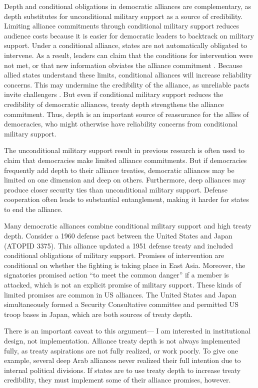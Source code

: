 \documentclass[12pt]{article}
\begin{document}
Depth and conditional obligations in democratic alliances are complementary, as depth substitutes for unconditional military support as a source of credibility. 
Limiting alliance commitments through conditional military support reduces audience costs because it is easier for democratic leaders to backtrack on military support. 
Under a conditional alliance, states are not automatically obligated to intervene. 
As a result, leaders can claim that the conditions for intervention were not met, or that new information obviates the alliance commitment \citep{LevenduskyHorowitz2012}. 
Because allied states understand these limits, conditional alliances will increase reliability concerns. 
This may undermine the credibility of the alliance, as unreliable pacts invite challengers \citep{Smith1995}. 
But even if conditional military support reduces the credibility of democratic alliances, treaty depth strengthens the alliance commitment. 
Thus, depth is an important source of reassurance for the allies of democracies, who might otherwise have reliability concerns from conditional military support. 


The unconditional military support result in previous research is often used to claim that democracies make limited alliance commitments. 
But if democracies frequently add depth to their alliance treaties, democratic alliances may be limited on one dimension and deep on others. 
Furthermore, deep alliances may produce closer security ties than unconditional military support. 
Defense cooperation often leads to substantial entanglement, making it harder for states to end the alliance. 


Many democratic alliances combine conditional military support and high treaty depth. 
Consider a 1960 defense pact between the United States and Japan (ATOPID 3375).
This alliance updated a 1951 defense treaty and included conditional obligations of military support. 
Promises of intervention are conditional on whether the fighting is taking place in East Asia. 
Moreover, the signatories promised action ``to meet the common danger'' if a member is attacked, which is not an explicit promise of military support. 
These kinds of limited promises are common in US alliances. 
The United States and Japan simultaneously formed a Security Consultative committee and permitted US troop bases in Japan, which are both sources of treaty depth.  


There is an important caveat to this argument--- I am interested in institutional design, not implementation.
Alliance treaty depth is not always implemented fully, as treaty aspirations are not fully realized, or work poorly. 
To give one example, several deep Arab alliances never realized their full intention due to internal political divisions.  
If states are to use treaty depth to increase treaty credibility, they must implement some of their alliance promises, however. 
\end{document}
